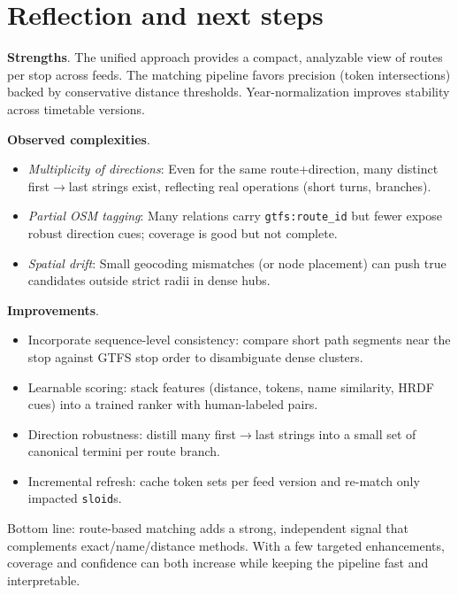 \section{Reflection and next steps}
\textbf{Strengths}. The unified approach provides a compact, analyzable view of routes per stop across feeds. The matching pipeline favors precision (token intersections) backed by conservative distance thresholds. Year-normalization improves stability across timetable versions.

\textbf{Observed complexities}.
\begin{itemize}
  \item \emph{Multiplicity of directions}: Even for the same route+direction, many distinct first$\rightarrow$last strings exist, reflecting real operations (short turns, branches).
  \item \emph{Partial OSM tagging}: Many relations carry \texttt{gtfs:route\_id} but fewer expose robust direction cues; coverage is good but not complete.
  \item \emph{Spatial drift}: Small geocoding mismatches (or node placement) can push true candidates outside strict radii in dense hubs.
\end{itemize}

\textbf{Improvements}.
\begin{itemize}
  \item Incorporate sequence-level consistency: compare short path segments near the stop against GTFS stop order to disambiguate dense clusters.
  \item Learnable scoring: stack features (distance, tokens, name similarity, HRDF cues) into a trained ranker with human-labeled pairs.
  \item Direction robustness: distill many first$\rightarrow$last strings into a small set of canonical termini per route branch.
  \item Incremental refresh: cache token sets per feed version and re-match only impacted \texttt{sloid}s.
\end{itemize}

\noindent Bottom line: route-based matching adds a strong, independent signal that complements exact/name/distance methods. With a few targeted enhancements, coverage and confidence can both increase while keeping the pipeline fast and interpretable.

